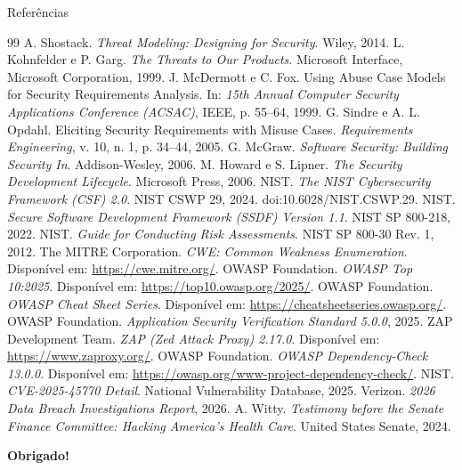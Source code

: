 \documentclass{beamer}
\begin{document}
\begin{frame}[allowframebreaks]{Referências}
    \tiny
    \begin{thebibliography}{99}
         A. Shostack. \emph{Threat Modeling: Designing for Security}. Wiley, 2014.
         L. Kohnfelder e P. Garg. \emph{The Threats to Our Products}. Microsoft Interface, Microsoft Corporation, 1999.
         J. McDermott e C. Fox. Using Abuse Case Models for Security Requirements Analysis. In: \emph{15th Annual Computer Security Applications Conference (ACSAC)}, IEEE, p. 55--64, 1999.
         G. Sindre e A. L. Opdahl. Eliciting Security Requirements with Misuse Cases. \emph{Requirements Engineering}, v. 10, n. 1, p. 34--44, 2005.
         G. McGraw. \emph{Software Security: Building Security In}. Addison-Wesley, 2006.
         M. Howard e S. Lipner. \emph{The Security Development Lifecycle}. Microsoft Press, 2006.
         NIST. \emph{The NIST Cybersecurity Framework (CSF) 2.0}. NIST CSWP 29, 2024. doi:10.6028/NIST.CSWP.29.
         NIST. \emph{Secure Software Development Framework (SSDF) Version 1.1}. NIST SP 800-218, 2022.
         NIST. \emph{Guide for Conducting Risk Assessments}. NIST SP 800-30 Rev. 1, 2012.
         The MITRE Corporation. \emph{CWE: Common Weakness Enumeration}. Disponível em: \url{https://cwe.mitre.org/}.
         OWASP Foundation. \emph{OWASP Top 10:2025}. Disponível em: \url{https://top10.owasp.org/2025/}.
         OWASP Foundation. \emph{OWASP Cheat Sheet Series}. Disponível em: \url{https://cheatsheetseries.owasp.org/}.
         OWASP Foundation. \emph{Application Security Verification Standard 5.0.0}, 2025.
         ZAP Development Team. \emph{ZAP (Zed Attack Proxy) 2.17.0}. Disponível em: \url{https://www.zaproxy.org/}.
         OWASP Foundation. \emph{OWASP Dependency-Check 13.0.0}. Disponível em: \url{https://owasp.org/www-project-dependency-check/}.
         NIST. \emph{CVE-2025-45770 Detail}. National Vulnerability Database, 2025.
         Verizon. \emph{2026 Data Breach Investigations Report}, 2026.
         A. Witty. \emph{Testimony before the Senate Finance Committee: Hacking America's Health Care}. United States Senate, 2024.
    \end{thebibliography}
\end{frame}

\begin{frame}[plain]
    \centering

    \vspace{1.2cm}

    {\small \textbf{Obrigado!}}

\end{frame}
\end{document}
